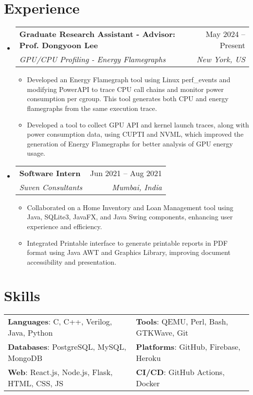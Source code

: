 \documentclass[letterpaper,11pt]{article}
\makeatletter
\newcommand{\resumeItem}[1]{
  \item\small{
    {#1 \vspace{-2pt}}
  }
}
\newcommand{\resumeSubheading}[4]{
  \vspace{-2pt}\item
    \begin{tabular*}{1.0\textwidth}[t]{l@{\extracolsep{\fill}}r}
      \vspace{-2pt}\textbf{#1} & \small #2 \\
      \textit{\small#3} & \textit{\small #4} \\
    \end{tabular*}\vspace{-7pt}
}
\newcommand{\resumeSubHeadingListStart}{\begin{itemize}[leftmargin=0.0in, label={}]}
\newcommand{\resumeSubHeadingListEnd}{\end{itemize}}
\newcommand{\resumeItemListStart}{\begin{itemize}}
\newcommand{\resumeItemListEnd}{\end{itemize}\vspace{-5pt}}
\makeatother
\begin{document}
\section{Experience}
\resumeSubHeadingListStart
\vspace{-2pt}

\resumeSubheading
{Graduate Research Assistant - Advisor: Prof. Dongyoon Lee}{May 2024 -- Present}
{GPU/CPU Profiling - Energy Flamegraphs}{New York, US}
\resumeItemListStart
\resumeItem{
  Developed an Energy Flamegraph tool using Linux perf\_events and modifying PowerAPI to trace CPU call chains and monitor power consumption per cgroup. This tool generates both CPU and energy flamegraphs from the same execution trace.
}
\resumeItem{
  Developed a tool to collect GPU API and kernel launch traces, along with power consumption data, using CUPTI and NVML, which improved the generation of Energy Flamegraphs for better analysis of GPU energy usage.
}
\resumeItemListEnd
\vspace{-3pt}

\resumeSubheading
{Software Intern}{Jun 2021 -- Aug 2021}
{Suven Consultants}{Mumbai, India}
\resumeItemListStart
\resumeItem{Collaborated on a Home Inventory and Loan Management tool using Java, SQLite3, JavaFX, and Java Swing components, enhancing user experience and efficiency.}
\resumeItem{Integrated Printable interface to generate printable reports in PDF format using Java AWT and Graphics Library, improving document accessibility and presentation.}
\resumeItemListEnd
\vspace{-3pt}
\resumeSubHeadingListEnd
\vspace{-18pt}



\section{Skills}
\vspace{-4pt}
\begin{itemize}[leftmargin=0.2in, label={}]
  {\item{
        \begin{tabular}{ l@{\hskip 0.2in} l }
          \textbf{Languages}: C, C++, Verilog, Java, Python     & \qquad \textbf{Tools}: QEMU, Perl, Bash, GTKWave, Git \\
          \textbf{Databases}: PostgreSQL, MySQL, MongoDB        & \qquad \textbf{Platforms}: GitHub, Firebase, Heroku   \\
          \textbf{Web}: React.js, Node.js, Flask, HTML, CSS, JS & \qquad \textbf{CI/CD}: GitHub Actions, Docker
        \end{tabular}
        }}
\end{itemize}
\vspace{-22pt}
\end{document}
